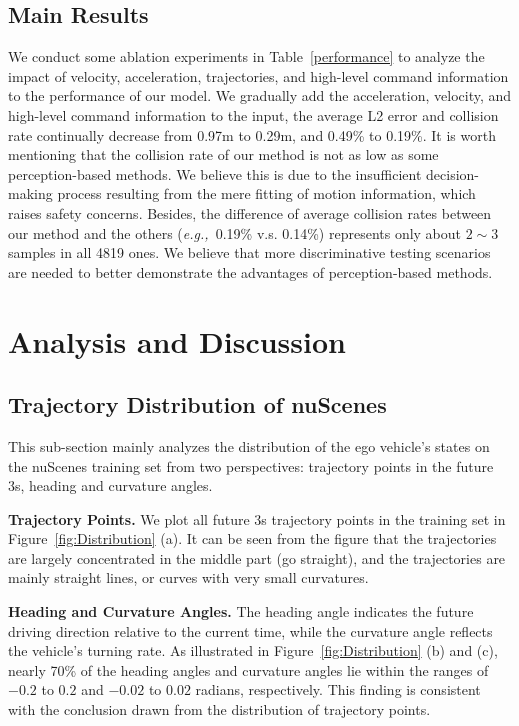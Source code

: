 \documentclass[10pt,twocolumn,letterpaper]{article}
\def\eg{\emph{e.g.,~}}
\newcommand{\myPara}[1]{\vspace{.05in}\noindent\textbf{#1.}\quad}
\begin{document}
\subsection{Main Results}
We conduct some ablation experiments 
in Table~\ref{performance}
to analyze the impact of 
velocity, acceleration, trajectories, and high-level command information to the performance of our model. 
We gradually add the acceleration, velocity, and high-level command information 
to the input, the average L2 error and 
collision rate continually decrease
from 0.97m to 0.29m, and 
0.49\% to 0.19\%.
It is worth mentioning that the collision rate of our method is not as low as some perception-based methods. We believe this is due to the insufficient decision-making process resulting from the mere fitting of motion information, which raises safety concerns.
Besides, the difference of average collision rates between our method and the others (\eg{0.19\% v.s. 0.14\%}) represents only about $2\sim3$ samples in all 4819 ones. 
We believe that more discriminative testing scenarios are needed to better demonstrate the advantages of perception-based methods.


\section{Analysis and Discussion}

\subsection{Trajectory Distribution of nuScenes}
This sub-section mainly analyzes the distribution of 
the ego vehicle's states on
the nuScenes training set from two perspectives: 
trajectory points in the future 3s, heading and curvature angles. 


\myPara{Trajectory Points} 
We plot all future 3s trajectory points in 
the training set in Figure~\ref{fig:Distribution} (a). 
It can be seen from the figure that the trajectories
are largely concentrated in the middle part (go straight), 
and the trajectories are mainly straight lines, or curves with very small curvatures.


\myPara{Heading and Curvature Angles}
The heading angle indicates the future driving direction relative to the current time, 
while the curvature angle reflects the vehicle's turning rate. 
As illustrated in Figure~\ref{fig:Distribution} (b) and (c), nearly 70\% of the heading angles and curvature angles lie within the ranges of $-0.2$ to $0.2$ and $-0.02$ to $0.02$ radians, respectively.
This finding is consistent with the conclusion drawn from the distribution of trajectory points.
\end{document}
